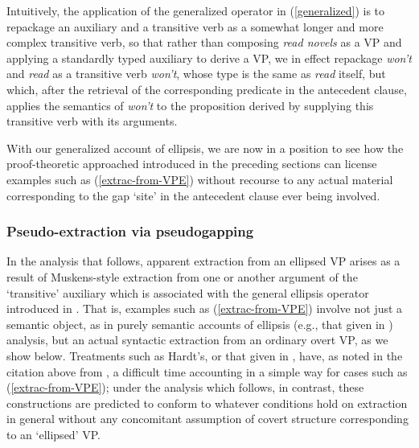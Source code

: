 \documentclass[output=paper,colorlinks,citecolor=brown]{langscibook}
\begin{document}
\noindent Intuitively, the application of the generalized operator in
(\ref{generalized}) is to repackage an auxiliary and a transitive verb as a
somewhat longer and more complex transitive verb, so that rather than
composing \textit{read novels} as a VP and applying a standardly typed
auxiliary to derive a VP, we in effect repackage \textit{won't} and \textit{read} as
a transitive verb \textit{won't}, whose type is the same as \textit{read} itself,
but which, after the retrieval of the corresponding predicate in the
antecedent clause, applies the semantics of \textit{won't} to the proposition
derived by supplying this transitive verb with its arguments.

With our generalized account of ellipsis, we are now in a position to
see how the proof-theoretic approached introduced in the preceding
sections can license examples such as (\ref{extrac-from-VPE}) without
recourse to any actual material corresponding to the gap `site' in the
antecedent clause ever being involved.

\subsubsection{Pseudo-extraction via pseudogapping}\label{subsubsec:pseudoextrac}

In the analysis that follows, apparent extraction from an ellipsed VP
arises as a result of Muskens-style extraction from one or another
argument of the `transitive' auxiliary which is associated with the
general ellipsis operator introduced in
. That is, examples such as
(\ref{extrac-from-VPE}) involve not just a semantic object, as in purely
semantic accounts of ellipsis (e.g., that given in \citealt{hardt-diss})
analysis, but an actual syntactic extraction from an ordinary overt
VP, as we show below. Treatments such as Hardt's, or that given in
\citet{dalrymple-etal1991}, have, as noted in the citation above from
\citet{Elbourne2008}, a difficult time accounting in a simple way for cases
such as (\ref{extrac-from-VPE}); under the analysis which follows, in
contrast, these constructions are predicted to conform to whatever
conditions hold on extraction in general without any concomitant
assumption of covert structure corresponding to an `ellipsed' VP.
\end{document}
